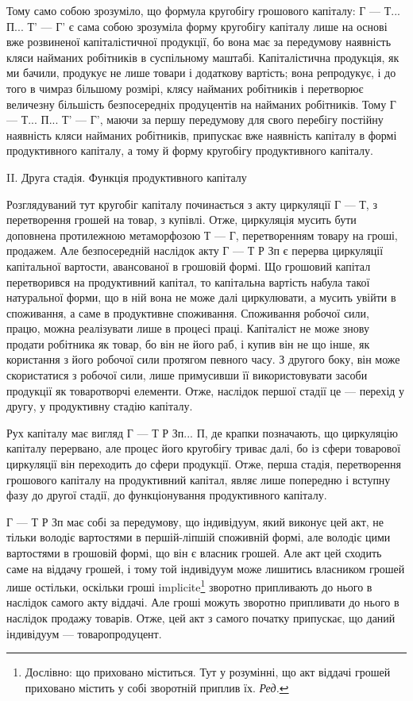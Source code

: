 Тому само собою зрозуміло, що формула кругобігу грошового капіталу:
Г — Т... П... Т' — Г' є сама собою зрозуміла форму кругобігу капіталу
лише на основі вже розвиненої капіталістичної продукції, бо вона
має за передумову наявність кляси найманих робітників в суспільному
маштабі. Капіталістична продукція, як ми бачили, продукує не
лише товари і додаткову вартість; вона репродукує, і до того в чимраз
більшому розмірі, клясу найманих робітників і перетворює величезну
більшість безпосередніх продуцентів на найманих робітників. Тому
Г — Т... П... Т' — Г', маючи за першу передумову для свого перебігу
постійну наявність кляси найманих робітників, припускає вже наявність
капіталу в формі продуктивного капіталу, а тому й форму кругобігу
продуктивного капіталу.

II. Друга стадія. Функція продуктивного капіталу

Розглядуваний тут кругобіг капіталу починається з акту циркуляції
Г — Т, з перетворення грошей на товар, з купівлі. Отже, циркуляція
мусить бути доповнена протилежною метаморфозою Т — Г, перетворенням
товару на гроші, продажем. Але безпосередній наслідок акту
Г — Т Р Зп є перерва циркуляції капітальної вартости, авансованої в
грошовій формі. Що грошовий капітал перетворився на продуктивний
капітал, то капітальна вартість набула такої натуральної форми, що в
ній вона не може далі циркулювати, а мусить увійти в споживання, а
саме в продуктивне споживання. Споживання робочої сили, працю, можна
реалізувати лише в процесі праці. Капіталіст не може знову продати
робітника як товар, бо він не його раб, і купив він не що інше, як
користання з його робочої сили протягом певного часу. З другого боку,
він може скористатися з робочої сили, лише примусивши її використовувати
засоби продукції як товаротворчі елементи. Отже, наслідок першої
стадії це — перехід у другу, у продуктивну стадію капіталу.

Рух капіталу має вигляд Г — Т Р Зп... П, де крапки позначають, що
циркуляцію капіталу перервано, але процес його кругобігу триває далі,
бо із сфери товарової циркуляції він переходить до сфери продукції.
Отже, перша стадія, перетворення грошового капіталу на продуктивний
капітал, являє лише попередню і вступну фазу до другої стадії, до
функціонування продуктивного капіталу.

Г — Т Р Зп має собі за передумову, що індивідуум, який виконує цей
акт, не тільки володіє вартостями в першій-ліпшій споживній формі,
але володіє цими вартостями в грошовій формі, що він є власник грошей.
Але акт цей сходить саме на віддачу грошей, і тому той індивідуум
може лишитись власником грошей лише остільки, оскільки гроші
implicite\footnote*{
Дослівно: що приховано міститься. Тут у розумінні, що акт віддачі грошей приховано містить у собі
зворотній приплив їх. \emph{Ред.}
} зворотно припливають до нього в наслідок самого акту віддачі.
Але гроші можуть зворотно припливати до нього в наслідок продажу товарів. Отже, цей акт з
самого початку припускає, що даний індивідуум — товаропродуцент.

